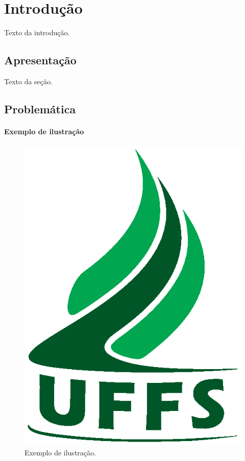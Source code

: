\chapter{Introdução}

Texto da introdução.

\section{Apresentação}

Texto da seção.

\section{Problemática}

\subsubsection{Exemplo de ilustração}

\begin{figure}[h]
\captionsetup{justification=raggedright, singlelinecheck=false}
\centering
\includegraphics[scale=0.4]{figuras/uffs.eps}
\caption{Exemplo de ilustração.}
\label{fig:uffs}
\end{figure}

